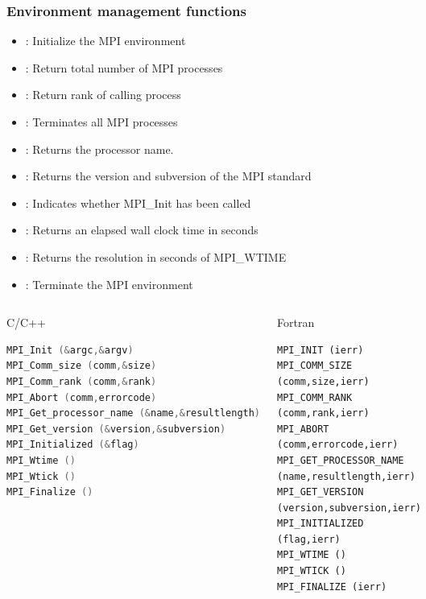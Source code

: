 \documentclass[9pt,c]{beamer}
\begin{document}
\begin{frame}
  \frametitle{Environment management functions}
  \begin{itemize}
    \item {}: Initialize the MPI environment
    \item {}: Return total number of MPI processes
    \item {}: Return rank of calling process
    \item {}: Terminates all MPI processes
    \item {}: Returns the processor name.
    \item {}: Returns the version and subversion of the MPI standard
    \item {}: Indicates whether MPI\_Init has been called
    \item {}: Returns an elapsed wall clock time in seconds
    \item {}: Returns the resolution in seconds of MPI\_WTIME
    \item {}: Terminate the MPI environment
  \end{itemize}
  \framebreak
  \vspace{-0.5cm}
  \begin{columns}
    \begin{exampleblock}{C/C++}
      \begin{lstlisting}[basicstyle=\scriptsize\ttfamily,language=C]
MPI_Init (&argc,&argv) 
MPI_Comm_size (comm,&size) 
MPI_Comm_rank (comm,&rank) 
MPI_Abort (comm,errorcode)
MPI_Get_processor_name (&name,&resultlength)
MPI_Get_version (&version,&subversion)
MPI_Initialized (&flag) 
MPI_Wtime ()
MPI_Wtick ()
MPI_Finalize ()
      \end{lstlisting}
    \end{exampleblock}
    \begin{exampleblock}{Fortran}
      \begin{lstlisting}[basicstyle=\scriptsize\ttfamily,language={[90]Fortran}]
MPI_INIT (ierr)
MPI_COMM_SIZE (comm,size,ierr)
MPI_COMM_RANK (comm,rank,ierr)
MPI_ABORT (comm,errorcode,ierr)
MPI_GET_PROCESSOR_NAME (name,resultlength,ierr)
MPI_GET_VERSION (version,subversion,ierr)
MPI_INITIALIZED (flag,ierr)
MPI_WTIME ()
MPI_WTICK ()
MPI_FINALIZE (ierr)
      \end{lstlisting}
    \end{exampleblock}
  \end{columns}
\end{frame}
\end{document}
